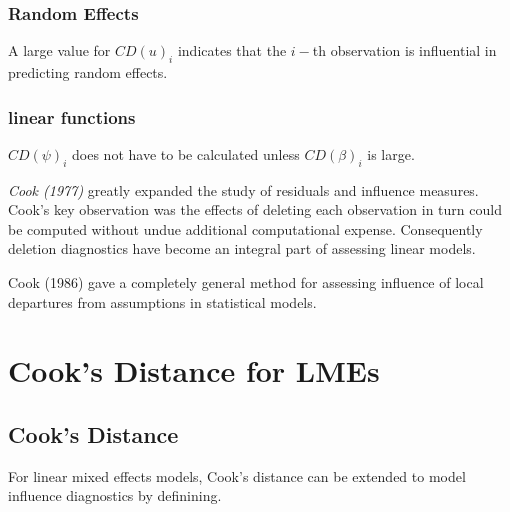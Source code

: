 \documentclass[12pt, a4paper]{report}
\theoremstyle{plain}
\theoremstyle{definition}
\theoremstyle{remark}
\begin{document}
\subsubsection{Random Effects}

A large value for $CD(u)_i$ indicates that the $i-$th observation is influential in predicting random effects.


\subsubsection{linear functions}

$CD(\psi)_i$ does not have to be calculated unless $CD(\beta)_i$ is large.


%	
%	
\textit{Cook (1977)} greatly expanded the study of residuals and influence measures. Cook's key observation was the effects of deleting each observation in turn could be computed without undue additional computational expense. Consequently deletion diagnostics have become an integral part of assessing linear models.


Cook (1986) gave a completely general method for assessing influence of local departures from
assumptions in statistical models.







\section{Cook's Distance for LMEs} %




\subsection{Cook's Distance}%

For linear mixed effects models, Cook's distance can be extended to model influence diagnostics by definining.
\end{document}
